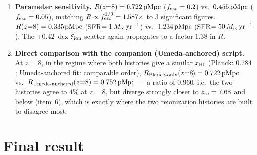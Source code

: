 \documentclass[11pt,a4paper]{article}
\newcommand{\pMpc}{\,{\rm pMpc}}
\newcommand{\Msun}{\,M_\odot}
\begin{document}
\begin{enumerate}
      $f_{\rm esc}=0.2$ — a factor of $\sim6$ larger than at $z=7.12$, and formally divergent as
      $x_{\rm HI}\to0$ since eq.~(\ref{eq:R}) has $x_{\rm HI}$ in the denominator with everything else varying
      smoothly. This is flagged, not silently plotted as if physical: once the IGM is already highly ionized,
      an isolated galaxy's own ``bubble'' is no longer a meaningful concept (it has merged with the bulk
      ionized IGM), so this regime is a breakdown of the single-source photon-counting picture, not a real
      prediction.
\item \textbf{Parameter sensitivity.} $R(z{=}8)=0.722\pMpc$ ($f_{\rm esc}=0.2$) vs.\ $0.455\pMpc$
      ($f_{\rm esc}=0.05$), matching $R\propto f_{\rm esc}^{1/3}=1.587\times$ to 3 significant figures.
      $R(z{=}8)=0.335\pMpc$ (SFR$=1\Msun\,{\rm yr^{-1}}$) vs.\ $1.234\pMpc$ (SFR$=50\Msun\,{\rm yr^{-1}}$).
      The $\pm0.42$~dex $\xi_{\rm ion}$ scatter \citep{Llerena2024} again propagates to a factor $1.38$ in $R$.
\item \textbf{Direct comparison with the companion (Umeda-anchored) script.} At $z=8$, in the regime where
      both histories give a similar $x_{\rm HI}$ (Planck: $0.784$; Umeda-anchored fit: comparable order),
      $R_{\rm Planck\text{-}only}(z{=}8)=0.722\pMpc$ vs.\ $R_{\rm Umeda\text{-}anchored}(z{=}8)=0.752\pMpc$ —
      a ratio of $0.960$, i.e.\ the two histories agree to $4\%$ at $z=8$, but diverge strongly closer to
      $z_{\rm re}=7.68$ and below (item~6), which is exactly where the two reionization histories are built
      to disagree most.
\end{enumerate}

\section{Final result}
\label{sec:final}
\end{document}

